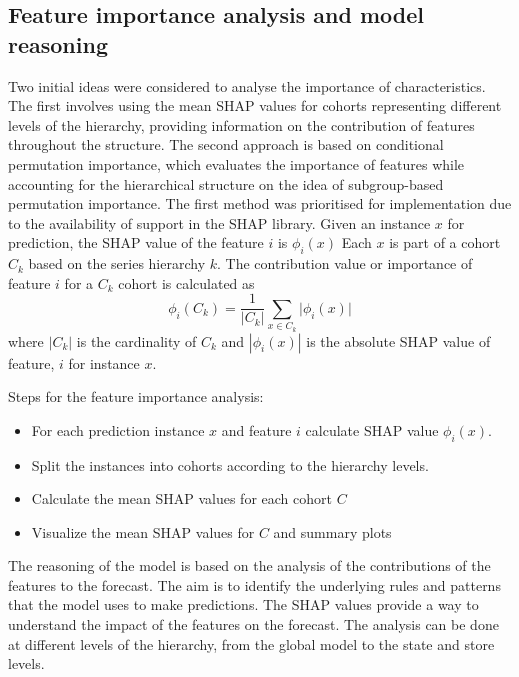 
\subsection{Feature importance analysis and model reasoning}\label{subsec:feature-importance-analysis-and-model-reasoning}
Two initial ideas were considered to analyse the importance of characteristics.
The first involves using the mean SHAP values for cohorts representing different levels of the hierarchy, providing information on the contribution of features throughout the structure.
The second approach is based on conditional permutation importance, which evaluates the importance of features while
accounting for the hierarchical structure on the idea of subgroup-based permutation importance\cite{cond_pfi}.
The first method was prioritised for implementation due to the availability of support in the SHAP library\cite{scott_lundberg_consistent_2018}.
Given an instance $x$ for prediction, the SHAP value of the feature $i$ is $\phi_i(x)$
Each $x$ is part of a cohort $C_k$ based on the series hierarchy $k$.
The contribution value or importance of feature $i$ for a $C_{k}$ cohort is calculated as
\begin{equation}
    \phi_i(C_k) = \frac{1}{|C_k|} \sum_{x \in C_k} |{\phi_i(x)|}
\end{equation}
where $|C_k|$ is the cardinality of $C_k$ and $|{\phi_i(x)}|$ is the absolute SHAP value of feature, $i$ for instance $x$.

Steps for the feature importance analysis:
\begin{itemize}
    \item For each prediction instance $x$ and feature \(i\) calculate SHAP value $\phi_i(x)$.
    \item Split the instances into cohorts according to the hierarchy levels.
    \item Calculate the mean SHAP values for each cohort $C$
    \item Visualize the mean SHAP values for $C$ and summary plots
\end{itemize}

The reasoning of the model is based on the analysis of the contributions of the features to the forecast.
The aim is to identify the underlying rules and patterns that the model uses to make predictions.
The SHAP values provide a way to understand the impact of the features on the forecast.
The analysis can be done at different levels of the hierarchy, from the global model to the state and store levels.



